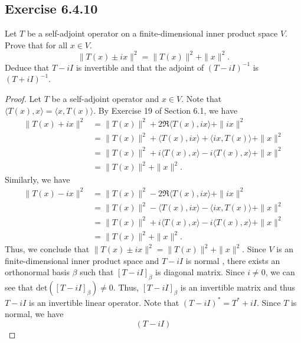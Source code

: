 \subsection*{Exercise 6.4.10} Let \( T  \) be a self-adjoint operator on a finite-dimensional inner product space \( V  \). Prove that for all \( x \in V  \).
\[ \|T(x) \pm ix\|^{2} = \|T(x)\|^{2} + \|x\|^{2}.  \]
Deduce that \( T - i I  \) is invertible and that the adjoint of \( (T - iI )^{-1} \) is \( (T + i I )^{-1} \).
\begin{proof}
Let \( T  \) be a self-adjoint operator and \( x \in V  \). Note that \( \langle T(x)  , x  \rangle = \langle x , T(x) \rangle \). By Exercise 19 of Section 6.1, we have
\begin{align*}
    \|T(x) + ix \|^{2} &= \|T(x)\|^{2} + 2 \Re \langle T(x) , ix  \rangle + \|ix \|^{2} \\
                       &= \|T(x)\|^{2} + \langle T(x)  , ix  \rangle + \langle ix  , T(x)  \rangle + \|x\|^{2}  \\
                       &= \|T(x)\|^{2} +  i \langle T(x)   , x \rangle - i \langle T(x)  , x  \rangle + \|x\|^{2} \\  
                       &= \|T(x)\|^{2} + \|x\|^{2}.
\end{align*}
Similarly, we have
\begin{align*}
    \|T(x) - ix \|^{2} &= \|T(x)\|^{2} - 2 \Re \langle T(x) , ix  \rangle + \|ix\|^{2} \\
                       &= \|T(x)\|^{2} - \langle T(x)  , ix  \rangle - \langle ix , T(x) \rangle + \|x\|^{2} \\
                       &= \|T(x)\|^{2} + i \langle T(x)  , x  \rangle - i \langle T(x)  , x  \rangle + \|x\|^{2} \\
                       &= \|T(x)\|^{2} + \|x\|^{2}.
\end{align*}
Thus, we conclude that \( \|T(x) \pm ix\|^{2} = \|T(x)\|^{2} + \|x\|^{2} \). Since \( V  \) is an finite-dimensional inner product space and \( T - iI  \) is normal , there exists an orthonormal basis \(  \beta \) such that  \( [T - iI]_{\beta} \) is diagonal matrix. Since \( i \neq 0  \), we can see that \( \text{det}([T - i I ]_{\beta}) \neq 0  \). Thus, \( [T - iI ]_{\beta} \) is an invertible matrix and thus \( T - iI  \) is an invertible linear operator. Note that \( (T - iI)^{*} = T^{*} + iI \). Since \( T  \) is normal, we have   
\[  (T - i I) \]
\end{proof}

